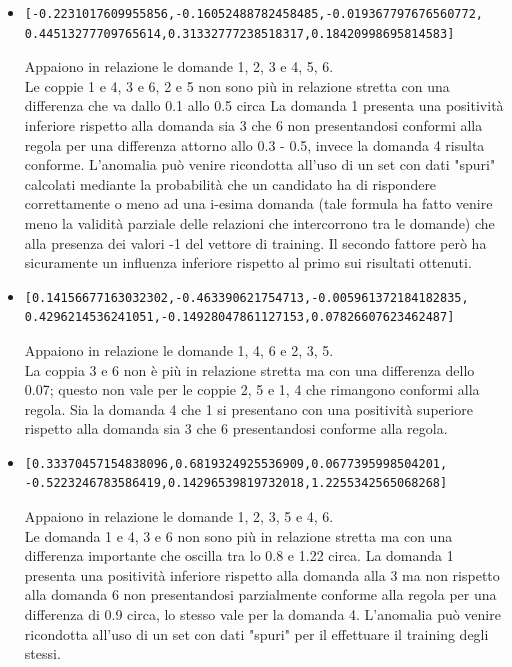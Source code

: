 \begin{itemize}
\item  \begin{verbatim}[-0.2231017609955856,-0.16052488782458485,-0.019367797676560772,
0.44513277709765614,0.31332777238518317,0.18420998695814583]
\end{verbatim}
Appaiono in relazione le domande 1, 2, 3 e 4, 5, 6.\\
Le coppie 1 e 4, 3 e 6, 2 e 5 non sono pi\`u in relazione stretta con una differenza che va dallo 0.1 allo 0.5 circa La domanda 1 presenta una positivit\`a inferiore rispetto alla domanda sia 3 che 6 non presentandosi conformi alla regola per una differenza attorno allo 0.3 - 0.5, invece la domanda 4 risulta conforme. L'anomalia pu\`o venire ricondotta all'uso di un set con dati "spuri" calcolati mediante la probabilit\`a che un candidato ha di rispondere correttamente o meno ad una i-esima domanda (tale formula ha fatto venire meno la validit\`a parziale delle relazioni che intercorrono tra le domande) che alla presenza dei valori -1 del vettore di training. Il secondo fattore per\`o ha sicuramente un influenza inferiore rispetto al primo sui risultati ottenuti.

\item \begin{verbatim}[0.14156677163032302,-0.463390621754713,-0.005961372184182835,
0.4296214536241051,-0.14928047861127153,0.07826607623462487]
\end{verbatim}
Appaiono in relazione le domande 1, 4, 6 e 2, 3, 5.\\
La coppia 3 e 6 non \`e pi\`u in relazione stretta ma con una differenza dello 0.07; questo non vale per le coppie 2, 5 e 1, 4 che rimangono conformi alla regola. Sia la domanda 4 che 1 si presentano con una positivit\`a superiore rispetto alla domanda sia 3 che 6 presentandosi conforme alla regola.

\item  \begin{verbatim}[0.33370457154838096,0.6819324925536909,0.0677395998504201,
-0.5223246783586419,0.14296539819732018,1.2255342565068268]
\end{verbatim}
Appaiono in relazione le domande 1, 2, 3, 5 e  4, 6.\\
Le domanda 1 e 4, 3 e 6 non sono pi\`u in relazione stretta ma con una differenza importante che oscilla tra lo 0.8 e 1.22 circa. La domanda 1 presenta una positivit\`a inferiore rispetto alla domanda alla 3 ma non rispetto alla domanda 6 non presentandosi parzialmente conforme alla regola per una differenza di 0.9 circa, lo stesso vale per la domanda 4. L'anomalia pu\`o venire ricondotta all'uso di un set con dati "spuri" per il effettuare il training degli stessi.


\end{itemize}
